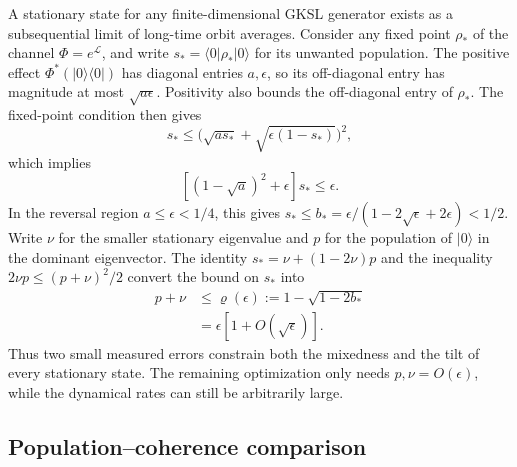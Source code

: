 \documentclass[aps,pra,reprint,amsmath,amssymb,nofootinbib,floatfix,longbibliography]{revtex4-2}
\theoremstyle{aps}
\newcommand{\eps}{\epsilon}
\newcommand{\ket}[1]{|#1\rangle}
\newcommand{\bra}[1]{\langle#1|}
\newcommand{\proj}[1]{|#1\rangle\langle#1|}
\begin{document}
A stationary state for any finite-dimensional GKSL generator exists as a subsequential limit of long-time orbit averages. Consider any fixed point $\rho_*$ of the channel $\Phi=e^{\mathcal L}$, and write $s_*=\bra0\rho_*\ket0$ for its unwanted population. The positive effect $\Phi^*(\proj0)$ has diagonal entries $a,\eps$, so its off-diagonal entry has magnitude at most $\sqrt{a\eps}$. Positivity also bounds the off-diagonal entry of $\rho_*$. The fixed-point condition then gives
\[
 s_*\le\bigl(\sqrt{as_*}+\sqrt{\eps(1-s_*)}\bigr)^2,
\]
which implies
\begin{equation}\label{eq:budget-cross}
 [(1-\sqrt a)^2+\eps]s_*\le\eps.
\end{equation}
In the reversal region $a\le\eps<1/4$, this gives $s_*\le b_*=\eps/(1-2\sqrt\eps+2\eps)<1/2$. Write $\nu$ for the smaller stationary eigenvalue and $p$ for the population of $\ket0$ in the dominant eigenvector. The identity $s_*=\nu+(1-2\nu)p$ and the inequality $2\nu p\le(p+\nu)^2/2$ convert the bound on $s_*$ into
\begin{equation}\label{eq:budget-leading}
 \begin{aligned}
 p+\nu&\le\varrho(\eps):=1-\sqrt{1-2b_*}\\
      &=\eps[1+O(\sqrt\eps)].
 \end{aligned}
\end{equation}
Thus two small measured errors constrain both the mixedness and the tilt of every stationary state. The remaining optimization only needs $p,\nu=O(\eps)$, while the dynamical rates can still be arbitrarily large.

\subsection{Population--coherence comparison}
\end{document}
